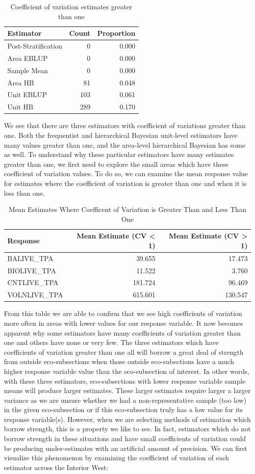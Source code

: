 \documentclass[12pt,twoside]{reedthesis}
\begin{document}
\begin{longtable}[t]{lrr}
\caption{\label{tab:over-one}Coefficient of variation estimates greater than one}\\
\toprule
Estimator & Count & Proportion\\
\midrule
Post-Stratification & 0 & 0.000\\
Area EBLUP & 0 & 0.000\\
Sample Mean & 0 & 0.000\\
Area HB & 81 & 0.048\\
Unit EBLUP & 103 & 0.061\\
\addlinespace
Unit HB & 289 & 0.170\\
\bottomrule
\end{longtable}
We see that there are three estimators with coefficient of variations greater than one. Both the frequentist and hierarchical Bayesian unit-level estimators have many values greater than one, and the area-level hierarchical Bayesian has some as well. To understand why these particular estimators have many estimates greater than one, we first need to explore the small areas which have these coefficient of variation values. To do so, we can examine the mean response value for estimates where the coefficient of variation is greater than one and when it is less than one.
\clearpage
\begin{longtable}[t]{lrr}
\caption{\label{tab:covg1l1}Mean Estimates Where Coefficent of Variation is Greater Than and Less Than One}\\
\toprule
Response & Mean Estimate (CV < 1) & Mean Estimate (CV > 1)\\
\midrule
BALIVE\_TPA & 39.655 & 17.473\\
BIOLIVE\_TPA & 11.522 & 3.760\\
CNTLIVE\_TPA & 181.724 & 96.469\\
VOLNLIVE\_TPA & 615.601 & 130.547\\
\bottomrule
\end{longtable}
From this table we are able to confirm that we see high coefficients of variation more often in areas with lower values for our response variable. It now becomes apparent why some estimators have many coefficients of variation greater than one and others have none or very few. The three estimators which have coefficients of variation greater than one all will borrow a great deal of strength from outside eco-subsections when those outside eco-subections have a much higher response variable value than the eco-subsection of interest. In other words, with these three estimators, eco-subsections with lower response variable sample means will produce larger estimates. These larger estimates require larger a larger variance as we are unsure whether we had a non-representative sample (too low) in the given eco-subsection or if this eco-subsection truly has a low value for its response variable(s). However, when we are selecting methods of estimation which borrow strength, this is a property we like to see. In fact, estimators which do not borrow strength in these situations and have small coefficients of variation could be producing under-estimates with an artificial amount of precision. We can first visualize this phenomenon by examining the coefficient of variation of each estimator across the Interior West:
\end{document}
